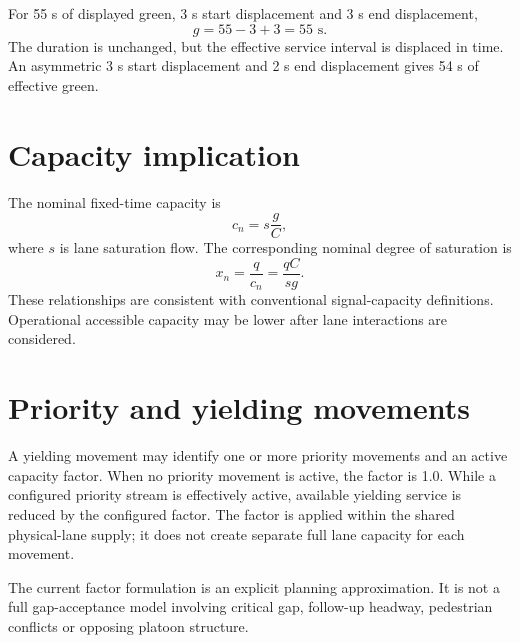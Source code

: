 For 55 s of displayed green, 3 s start displacement and 3 s end displacement,
\begin{equation}
g=55-3+3=55\text{ s}.
\end{equation}
The duration is unchanged, but the effective service interval is displaced in time.
An asymmetric 3 s start displacement and 2 s end displacement gives 54 s of effective
green.

\section{Capacity implication}
The nominal fixed-time capacity is
\begin{equation}
c_n=s\frac{g}{C},
\end{equation}
where $s$ is lane saturation flow.  The corresponding nominal degree of saturation is
\begin{equation}
x_n=\frac{q}{c_n}=\frac{qC}{sg}.
\end{equation}
These relationships are consistent with conventional signal-capacity definitions.
Operational accessible capacity may be lower after lane interactions are considered.

\section{Priority and yielding movements}
A yielding movement may identify one or more priority movements and an active capacity
factor.  When no priority movement is active, the factor is 1.0.  While a configured
priority stream is effectively active, available yielding service is reduced by the
configured factor.  The factor is applied within the shared physical-lane supply; it
does not create separate full lane capacity for each movement.

The current factor formulation is an explicit planning approximation.  It is not a
full gap-acceptance model involving critical gap, follow-up headway, pedestrian
conflicts or opposing platoon structure.

